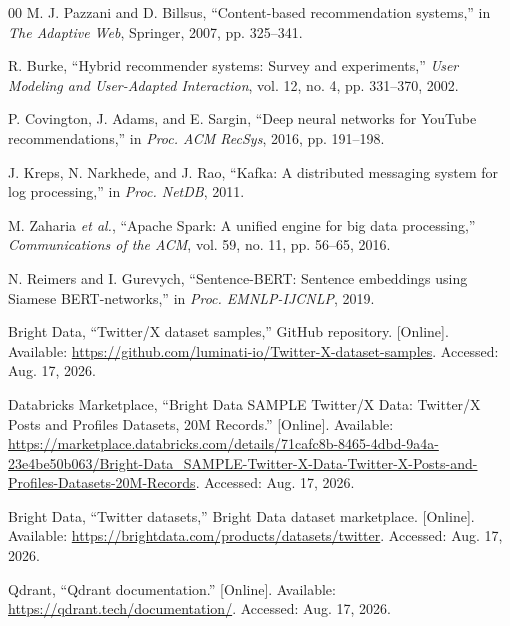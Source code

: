 \documentclass[conference]{IEEEtran}
\begin{document}
\begin{thebibliography}{00}
M. J. Pazzani and D. Billsus, ``Content-based recommendation systems,'' in \textit{The Adaptive Web}, Springer, 2007, pp. 325--341.

R. Burke, ``Hybrid recommender systems: Survey and experiments,'' \textit{User Modeling and User-Adapted Interaction}, vol. 12, no. 4, pp. 331--370, 2002.

P. Covington, J. Adams, and E. Sargin, ``Deep neural networks for YouTube recommendations,'' in \textit{Proc. ACM RecSys}, 2016, pp. 191--198.

J. Kreps, N. Narkhede, and J. Rao, ``Kafka: A distributed messaging system for log processing,'' in \textit{Proc. NetDB}, 2011.

M. Zaharia \textit{et al.}, ``Apache Spark: A unified engine for big data processing,'' \textit{Communications of the ACM}, vol. 59, no. 11, pp. 56--65, 2016.

N. Reimers and I. Gurevych, ``Sentence-BERT: Sentence embeddings using Siamese BERT-networks,'' in \textit{Proc. EMNLP-IJCNLP}, 2019.

Bright Data, ``Twitter/X dataset samples,'' GitHub repository. [Online]. Available: \url{https://github.com/luminati-io/Twitter-X-dataset-samples}. Accessed: Aug. 17, 2026.

Databricks Marketplace, ``Bright Data SAMPLE Twitter/X Data: Twitter/X Posts and Profiles Datasets, 20M Records.'' [Online]. Available: \url{https://marketplace.databricks.com/details/71cafc8b-8465-4dbd-9a4a-23e4be50b063/Bright-Data_SAMPLE-Twitter-X-Data-Twitter-X-Posts-and-Profiles-Datasets-20M-Records}. Accessed: Aug. 17, 2026.

Bright Data, ``Twitter datasets,'' Bright Data dataset marketplace. [Online]. Available: \url{https://brightdata.com/products/datasets/twitter}. Accessed: Aug. 17, 2026.

Qdrant, ``Qdrant documentation.'' [Online]. Available: \url{https://qdrant.tech/documentation/}. Accessed: Aug. 17, 2026.
\end{thebibliography}
\end{document}
